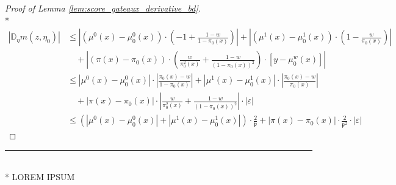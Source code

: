 \begin{proof}[Proof of Lemma \ref{lem:score_gateaux_derivative_bd}]\mbox{}\\*
    \begin{equation}
        \begin{aligned}
            \left| \mathbb{D}_{\eta} m(z, \eta_{0}) \right|
            & \leq \left|(\mu^{0}(x) - \mu_{0}^{0}(x)) \cdot \left(-1 + \frac{1 - w}{1 - \pi_{0}(x) }\right)\right|
            + \left| (\mu^{1}(x) - \mu_{0}^{1}(x)) \cdot \left(1 - \frac{w}{\pi_{0}(x)}\right)\right|\\
            & \quad + \left| (\pi(x) - \pi_{0}(x)) \cdot \left(\frac{w}{\pi_{0}^{2}(x)} + \frac{1-w}{\left(1-\pi_{0}(x)\right)^{2}}\right) \cdot \left[y - \mu_{0}^{w}(x)\right]\right| \\
            & \leq \left| \mu^{0}(x) - \mu_{0}^{0}(x) \right| \cdot \left|\frac{\pi_{0}(x) - w}{1 - \pi_{0}(x)}\right|
            + \left| \mu^{1}(x) - \mu_{0}^{1}(x) \right| \cdot \left|\frac{\pi_{0}(x) - w}{\pi_{0}(x)}\right|\\
            & \quad + \left| \pi(x) - \pi_{0}(x) \right| \cdot \left|\frac{w}{\pi_{0}^{2}(x)} + \frac{1-w}{\left(1-\pi_{0}(x)\right)^{2}} \right| \cdot \left| \varepsilon \right| \\
            & \leq \left(\left| \mu^{0}(x) - \mu_{0}^{0}(x) \right| + \left| \mu^{1}(x) - \mu_{0}^{1}(x) \right|\right) \cdot \frac{2}{\mathfrak{p}}
            + \left| \pi(x) - \pi_{0}(x) \right| \cdot \frac{2}{\mathfrak{p}^{2}} \cdot \left| \varepsilon \right|
        \end{aligned}
    \end{equation}
\end{proof}

\hrule

\begin{lem}\label{lem:score_2gateaux_derivative}\mbox{}\\*
    {\color{red} LOREM IPSUM}
\end{lem}


